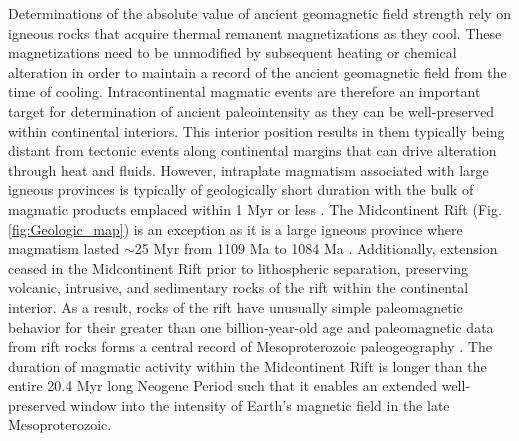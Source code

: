 \documentclass[9pt,twocolumn,twoside,lineno]{pnas-new}
\begin{document}
Determinations of the absolute value of ancient geomagnetic field strength rely on igneous rocks that acquire thermal remanent magnetizations as they cool. These magnetizations need to be unmodified by subsequent heating or chemical alteration in order to maintain a record of the ancient geomagnetic field from the time of cooling. Intracontinental magmatic events are therefore an important target for determination of ancient paleointensity as they can be well-preserved within continental interiors. This interior position results in them typically being distant from tectonic events along continental margins that can drive alteration through heat and fluids. However, intraplate magmatism associated with large igneous provinces is typically of geologically short duration with the bulk of magmatic products emplaced within 1 Myr or less \cite{Kasbohm2021a}. The Midcontinent Rift (Fig. \ref{fig:Geologic_map}) is an exception as it is a large igneous province where magmatism lasted $\sim$25 Myr from  1109 Ma to 1084 Ma \cite{Swanson-Hysell2019a}. Additionally, extension ceased in the Midcontinent Rift prior to lithospheric separation, preserving volcanic, intrusive, and sedimentary rocks of the rift within the continental interior. As a result, rocks of the rift have unusually simple paleomagnetic behavior for their greater than one billion-year-old age and paleomagnetic data from rift rocks forms a central record of Mesoproterozoic paleogeography \cite{Swanson-Hysell2021c}. The duration of magmatic activity within the Midcontinent Rift is longer than the entire 20.4 Myr long Neogene Period such that it enables an extended well-preserved window into the intensity of Earth's magnetic field in the late Mesoproterozoic. 
\end{document}
